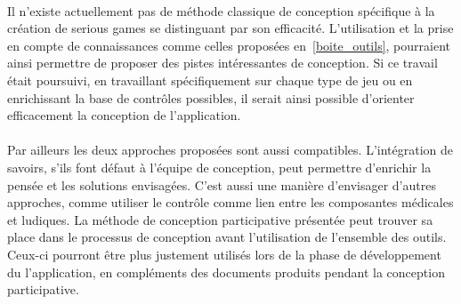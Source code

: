 \paragraph{} Il n'existe actuellement pas de méthode classique de conception spécifique à la création de serious games se distinguant par son efficacité. L'utilisation et la prise en compte de connaissances comme celles proposées en~\ref{boite_outils}, pourraient ainsi permettre de proposer des pistes intéressantes de conception. Si ce travail était poursuivi, en travaillant spécifiquement sur chaque type de jeu ou en enrichissant la base de contrôles possibles, il serait ainsi possible d'orienter efficacement la conception de l'application.

\paragraph{} Par ailleurs les deux approches proposées sont aussi compatibles. L'intégration de savoirs, s'ils font défaut à l'équipe de conception, peut permettre d'enrichir la pensée et les solutions envisagées. C'est aussi une manière d'envisager d'autres approches, comme utiliser le contrôle comme lien entre les composantes médicales et ludiques. La méthode de conception participative présentée peut trouver sa place dans le processus de conception avant l'utilisation de l'ensemble des outils. Ceux-ci pourront être plus justement utilisés lors de la phase de développement du l'application, en compléments des documents produits pendant la conception participative.
	

%	
